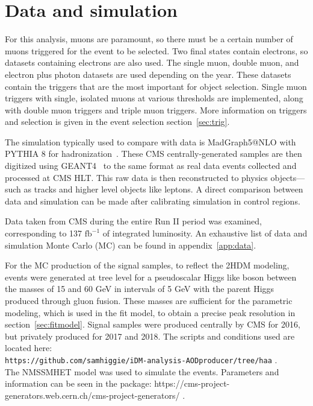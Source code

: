  


\section{Data and simulation}
For this analysis, muons are paramount, so there must be a certain number of muons triggered for the event to be selected. Two final states contain electrons, so datasets containing electrons are also used. The single muon, double muon, and electron plus photon datasets are used depending on the year. These datasets contain the triggers that are the most important for object selection. Single muon triggers with single, isolated muons at various thresholds are implemented, along with double muon triggers and triple muon triggers. More information on triggers and selection is given in the event selection section~\ref{sec:trig}. 

The simulation typically used to compare with data is MadGraph5@NLO with PYTHIA 8 for hadronization~\cite{PYTHIA}. These CMS centrally-generated samples are then digitized using GEANT4~\cite{GEANT4} to the same format as real data events collected and processed at CMS HLT. This raw data is then reconstructed to physics objects---such as tracks and higher level objects like leptons. A direct comparison between data and simulation can be made after calibrating simulation in control regions. 

Data taken from CMS during the entire Run II period was examined, corresponding to 137 $\text{fb}^{-1}$ of integrated luminosity. An exhaustive list of data and simulation Monte Carlo (MC) can be found in appendix~\ref{app:data}.   

For the MC production of the signal samples, to reflect the 2HDM modeling, events were generated at tree level for a pseudoscalar Higgs like boson between the masses of 15 and 60 GeV in intervals of 5 GeV with the parent Higgs produced through gluon fusion. These masses are sufficient for the parametric modeling, which is used in the fit model, to obtain a precise peak resolution in section~\ref{sec:fitmodel}. Signal samples were produced centrally by CMS for 2016, but privately produced for 2017 and 2018. The scripts and conditions used are located here:\\
 \texttt{https://github.com/samhiggie/iDM-analysis-AODproducer/tree/haa} .\\
The NMSSMHET model was used to simulate the events. Parameters and information can be seen in the package:
https://cms-project-generators.web.cern.ch/cms-project-generators/ .



